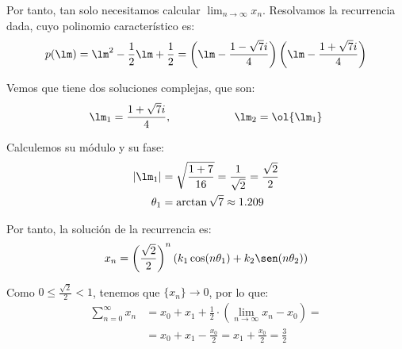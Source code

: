 \begin{ejercicio}
    Por tanto, tan solo necesitamos calcular $\lim_{n\to \infty} x_n$. Resolvamos la recurrencia dada, cuyo polinomio característico es:
    \begin{equation*}
        p(\lm) = \lm^2 - \frac{1}{2}\lm +\frac{1}{2} = \left(\lm -\frac{1-\sqrt{7}i}{4}\right)\left(\lm -\frac{1+\sqrt{7}i}{4}\right)
    \end{equation*}

    Vemos que tiene dos soluciones complejas, que son:
    \begin{equation*}
        \lm_1 = \frac{1+\sqrt{7}i}{4},\hspace{2cm} \lm_2=\ol{\lm_1}
    \end{equation*}

    Calculemos su módulo y su fase:
    \begin{align*}
        |\lm_1| &= \sqrt{\frac{1+7}{16}} = \frac{1}{\sqrt{2}} = \frac{\sqrt{2}}{2}\\
        \theta_1 &= \arctan \sqrt{7} \approx 1.209
    \end{align*}

    Por tanto, la solución de la recurrencia es:
    \begin{equation*}
        x_n = \left(\frac{\sqrt{2}}{2}\right)^n\left(k_1\cos(n\theta_1) + k_2\sen(n\theta_2)\right)
    \end{equation*}

    Como $0\leq \frac{\sqrt{2}}{2}<1$, tenemos que $\{x_n\}\to 0$, por lo que:
    \begin{align*}
        \sum\limits_{n=0}^{\infty} x_n
        &=  x_0+x_1 + \frac{1}{2} \cdot \left(\lim_{n\to \infty}x_{n} - x_0\right)=\\
        &= x_0+x_1-\frac{x_0}{2} = x_1+\frac{x_0}{2} = \frac{3}{2}
    \end{align*}
\end{ejercicio}

